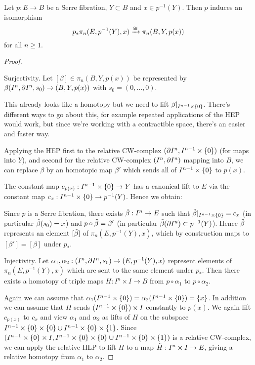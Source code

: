 \begin{proposition}
Let $p:E\to B$ be a Serre fibration, $Y\subset B$ and $x\in p^{-1}(Y)$. Then $p$ induces an isomorphism
\[p_*\pi_n(E,p^{-1}(Y),x)\xrightarrow{\cong}\pi_n(B,Y,p(x))\]
for all $n\geq1$.
\end{proposition}

\begin{proof}\ 

Surjectivity. Let $[\beta]\in\pi_n(B,Y,p(x))$ be represented by $\beta(I^n,\partial I^n,s_0)\to(B,Y,p(x))$ with $s_0=(0,\dots,0)$.


This already looks like a homotopy but we need to lift $\beta|_{I^{n-1}\times\{0\}}$. There's different ways to go about this, for example repeated applications of the HEP would work, but since we're working with a contractible space, there's an easier and faster way.

Applying the HEP first to the relative CW-complex $(\partial I^n,I^{n-1}\times\{0\})$ (for maps into $Y$), and second for the relative CW-complex $(I^n,\partial I^n)$ mapping into $B$, we can replace $\beta$ by an homotopic map $\beta'$ which sends all of $I^{n-1}\times\{0\}$ to $p(x)$.

The constant map $c_{p(x)}:I^{n-1}\times\{0\}\to Y$ has a canonical lift to $E$ via the constant map $c_x:I^{n-1}\times\{0\}\to p^{-1}(Y)$. Hence we obtain:
\begin{center}
\end{center}
Since $p$ is a Serre fibration, there exists $\tilde\beta:I^n\to E$ such that $\tilde\beta|_{I^{n-1}\times\{0\}}=c_x$ (in particular $\tilde\beta(s_0)=x$) and $p\circ\tilde\beta=\beta'$ (in particular $\tilde\beta(\partial I^n)\subset p^{-1}(Y)$). Hence $\tilde\beta$ represents an element $[\tilde\beta]$ of $\pi_n(E,p^{-1}(Y),x)$, which by construction maps to $[\beta']=[\beta]$ under $p_*$.

Injectivity. Let $\alpha_1,\alpha_2:(I^n,\partial I^n,s_0)\to(E,p^{-1}(Y),x)$ represent elements of $\pi_n(E,p^{-1}(Y),x)$ which are sent to the same element under $p_*$. Then there exists a homotopy of triple maps $H:I^n\times I\to B$ from $p\circ\alpha_1$ to $p\circ\alpha_2$.\alvaropls{}


Again we can assume that $\alpha_1(I^{n-1}\times\{0\})=\alpha_2(I^{n-1}\times\{0\})=\{x\}$. In addition we can assume that $H$ sends $(I^{n-1}\times\{0\})\times I$ constantly to $p(x)$. We again lift $c_{p(x)}$ to $c_x$ and view $\alpha_1$ and $\alpha_2$ as lifts of $H$ on the subspace $I^{n-1}\times\{0\}\times\{0\}\cup I^{n-1}\times\{0\}\times\{1\}$. Since $(I^{n-1}\times\{0\}\times I,I^{n-1}\times\{0\}\times\{0\}\cup I^{n-1}\times\{0\}\times\{1\})$ is a relative CW-complex, we can apply the relative HLP to lift $H$ to a map $\tilde H:I^n\times I\to E$, giving a relative homotopy from $\alpha_1$ to $\alpha_2$.
\end{proof}

